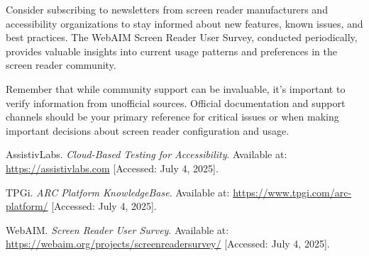 Consider subscribing to newsletters from screen reader manufacturers and accessibility organizations to stay informed about new features, known issues, and best practices. The WebAIM Screen Reader User Survey, conducted periodically, provides valuable insights into current usage patterns and preferences in the screen reader community.

Remember that while community support can be invaluable, it's important to verify information from unofficial sources. Official documentation and support channels should be your primary reference for critical issues or when making important decisions about screen reader configuration and usage.

\begin{thebibliography}{99}

 AssistivLabs. \textit{Cloud-Based Testing for Accessibility}. Available at: \url{https://assistivlabs.com} [Accessed: July 4, 2025].

 TPGi. \textit{ARC Platform KnowledgeBase}. Available at: \url{https://www.tpgi.com/arc-platform/} [Accessed: July 4, 2025].

 WebAIM. \textit{Screen Reader User Survey}. Available at: \url{https://webaim.org/projects/screenreadersurvey/} [Accessed: July 4, 2025].

\end{thebibliography}
